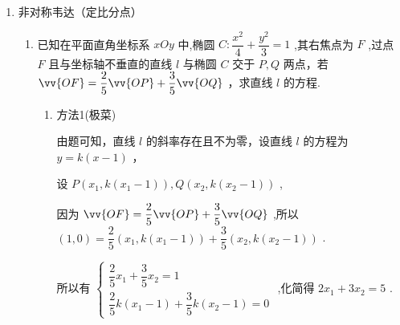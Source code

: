 \begin{enumerate}
\begin{enumerate}
\begin{jieda}
\begin{enumerate}
                $k_{AB} = \dfrac{y_1 - y_3}{x_1-x_3} = \dfrac{y_1-y_3}{m_1y_1 - m_2y_3}$，$k_{CD} = \dfrac{y_2- y_4}{m_1y_2 - m_2y_4}$

                $2m_1 = \dfrac{y_1+y_2}{y_1y_2} = \dfrac{1}{y_1} + \dfrac{1}{y_2}$，故$y_2 = \dfrac{y_1}{2m_1y_1 - 1}$，同理有$y_4 = \dfrac{y_3}{2m_2y_3 - 1}$

                故$k_{CD} = \dfrac{\dfrac{y_1}{2m_1y_1 - 1} - \dfrac{y_3}{2m_2y_3 - 1}}{\dfrac{m_1y_1}{2m_1y_1 - 1} - \dfrac{m_2y_3}{2m_2y_3 - 1}} = \dfrac{2(m_2-m_1)y_1y_3+(y_3-y_1)}{m_2y_3-m_1y_1} = \dfrac{5(y_3-y_1)}{m_2y_3-m_1y_1}$

                故$ \dfrac{{k}_{CD}}{{k}_{AB}} = 5$.
            \end{enumerate}
        \end{jieda}
    \end{enumerate}

    \item 非对称韦达（定比分点）
    \begin{enumerate}
         \item 已知在平面直角坐标系 ${xOy}$ 中,椭圆 $C : \dfrac{{x}^{2}}{4} + \dfrac{{y}^{2}}{3} = 1$ ,其右焦点为 $F$ ,过点 $F$ 且与坐标轴不垂直的直线 $l$ 与椭圆 $C$ 交于 $P,Q$ 两点，若 $\vv{OF} = \dfrac{2}{5}\vv{OP} + \dfrac{3}{5}\vv{OQ}$ ，求直线 $l$ 的方程.
        \begin{jieda}
            \begin{enumerate}
                \item 方法1(极菜)
                    
                由题可知，直线 $l$ 的斜率存在且不为零，设直线 $l$ 的方程为 $y = k\left( {x - 1}\right)$ ，
                
                设 $P\left( {{x}_{1},k\left( {{x}_{1} - 1}\right) }\right) ,Q\left( {{x}_{2},k\left( {{x}_{2} - 1}\right) }\right)$ ,
                
                因为 $\vv{OF} = \dfrac{2}{5}\vv{OP} + \dfrac{3}{5}\vv{OQ}$ ,所以 $\left( {1,0}\right)  = \dfrac{2}{5}\left( {{x}_{1},k\left( {{x}_{1} - 1}\right) }\right)  + \dfrac{3}{5}\left( {{x}_{2},k\left( {{x}_{2} - 1}\right) }\right)$ .
                
                所以有 $\left\{  \begin{array}{l} \dfrac{2}{5}{x}_{1} + \dfrac{3}{5}{x}_{2} = 1 \\  \dfrac{2}{5}k\left( {{x}_{1} - 1}\right)  + \dfrac{3}{5}k\left( {{x}_{2} - 1}\right)  = 0 \end{array}\right.$ ,化简得 $2{x}_{1} + 3{x}_{2} = 5$ .
    

\end{enumerate}
\end{jieda}
\end{enumerate}
\end{enumerate}
